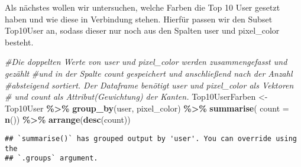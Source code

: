 \documentclass[
]{article}
\newenvironment{Shaded}{\begin{snugshade}}{\end{snugshade}}
\newcommand{\AttributeTok}[1]{\textcolor[rgb]{0.13,0.29,0.53}{#1}}
\newcommand{\CommentTok}[1]{\textcolor[rgb]{0.56,0.35,0.01}{\textit{#1}}}
\newcommand{\FunctionTok}[1]{\textcolor[rgb]{0.13,0.29,0.53}{\textbf{#1}}}
\newcommand{\NormalTok}[1]{#1}
\newcommand{\OtherTok}[1]{\textcolor[rgb]{0.56,0.35,0.01}{#1}}
\newcommand{\SpecialCharTok}[1]{\textcolor[rgb]{0.81,0.36,0.00}{\textbf{#1}}}
\begin{document}
Als nächstes wollen wir untersuchen, welche Farben die Top 10 User
gesetzt haben und wie diese in Verbindung stehen. Hierfür passen wir den
Subset Top10User an, sodass dieser nur noch aus den Spalten user und
pixel\_color besteht.

\begin{Shaded}
\begin{Highlighting}[]
\CommentTok{\#Die doppelten Werte von user und pixel\_color werden zusammengefasst und gezählt}
\CommentTok{\#und in der Spalte count gespeichert und anschließend nach der Anzahl}
\CommentTok{\#absteigend sortiert. Der Dataframe benötigt user und pixel\_color als Vektoren}
\CommentTok{\# und count als Attribut(Gewichtung) der Kanten.}
\NormalTok{Top10UserFarben }\OtherTok{\textless{}{-}}\NormalTok{ Top10User }\SpecialCharTok{\%\textgreater{}\%} \FunctionTok{group\_by}\NormalTok{(user, pixel\_color) }\SpecialCharTok{\%\textgreater{}\%} \FunctionTok{summarise}\NormalTok{(}
  \AttributeTok{count =} \FunctionTok{n}\NormalTok{()) }\SpecialCharTok{\%\textgreater{}\%} \FunctionTok{arrange}\NormalTok{(}\FunctionTok{desc}\NormalTok{(count))}
\end{Highlighting}
\end{Shaded}

\begin{verbatim}
## `summarise()` has grouped output by 'user'. You can override using the
## `.groups` argument.
\end{verbatim}
\end{document}

